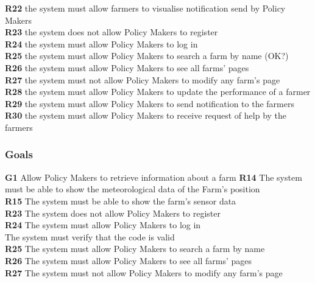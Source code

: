 \textbf{R22} the system must allow farmers to visualise notification send by Policy Makers\\
\textbf{R23} the system does not allow Policy Makers to register\\
\textbf{R24} the system must allow Policy Makers to log in\\
\textbf{R25} the system must allow Policy Makers to search a farm by name (OK?)\\
\textbf{R26} the system must allow Policy Makers to see all farms’ pages\\
\textbf{R27} the system must not allow Policy Makers to modify any farm’s page\\
\textbf{R28} the system must allow Policy Makers to update the performance of a farmer\\
\textbf{R29} the system must allow Policy Makers to send notification to the farmers\\
\textbf{R30} the system must allow Policy Makers to receive request of help by the farmers\\
\subsubsection{Goals}
\textbf{G1} Allow Policy Makers to retrieve information about a farm
    \textbf{R14} The system must be able to show the meteorological data of the Farm’s position\\
    \textbf{R15} The system must be able to show the farm’s sensor data\\
    \textbf{R23} The system does not allow Policy Makers to register\\
    \textbf{R24} The system must allow Policy Makers to log in\\
    \textbf{} The system must verify that the code is valid\\
    \textbf{R25} The system must allow Policy Makers to search a farm by name\\ 
    \textbf{R26} The system must allow Policy Makers to see all farms’ pages\\
    \textbf{R27} The system must not allow Policy Makers to modify any farm’s page\\
    \textbf{}
    \textbf{}
    \textbf{}
    \textbf{}
    \textbf{}
    \textbf{}
    
